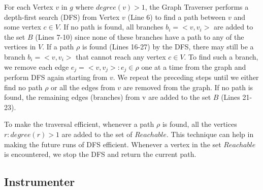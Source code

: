 For each Vertex $v$ in $g$ where $degree(v) > 1$, the Graph Traverser performs a depth-first search (DFS) from Vertex $v$ (Line 6) to find a path between $v$ and some vertex $c \in V$.
If no path is found, all branches $b_i = <v, v_i>$ are added to the set $B$ (Lines 7-10) since none of these branches have a path to any of the vertices in $V$. If a path $\rho$ is found (Lines 16-27) by the DFS, there may still be a branch $b_i = <v, v_i>$ that cannot reach any vertex $c \in V$. To find such a branch, we remove each edge $e_j=<v, v_j>: e_j \in \rho$ one at a time from the graph and perform DFS again starting from $v$. We repeat the preceding steps until we either find no path $\rho$ or all the edges from $v$ are removed from the graph. If no path is found, the remaining edges (branches) from v are added to the set $B$ (Lines 21-23). 

To make the traversal efficient, whenever a path $\rho$ is found, all the vertices $r: degree(r)>1$ are added to the set of $Reachable$. This technique can help in making the future runs of DFS efficient. Whenever a vertex in the set $Reachable$ is encountered, we stop the DFS and return the current path.
 
\subsection{Instrumenter}

